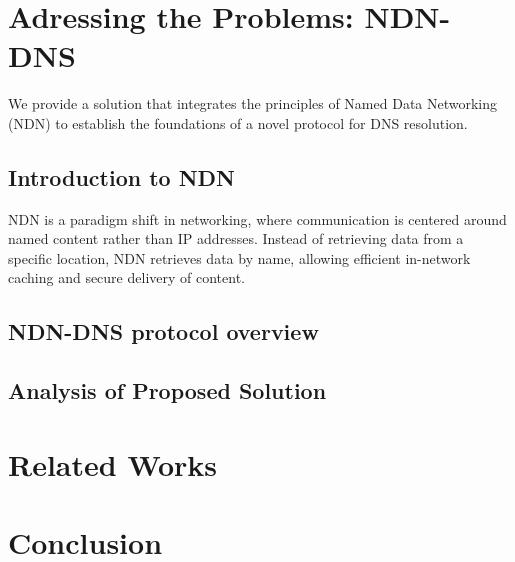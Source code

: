 \documentclass[conference]{IEEEtran}
\begin{document}
\section{Adressing the Problems: NDN-DNS}
We provide a solution that integrates the principles of Named Data Networking (NDN) to establish the foundations of a novel protocol for DNS resolution.
\subsection{Introduction to NDN}
NDN is a paradigm shift in networking, where communication is centered around named content rather than IP addresses. Instead of retrieving data from a specific location, NDN retrieves data by name, allowing efficient in-network caching and secure delivery of content.

\subsection{NDN-DNS protocol overview}

\subsection{Analysis of Proposed Solution}

\section{Related Works}

\section{Conclusion}



\end{document}
